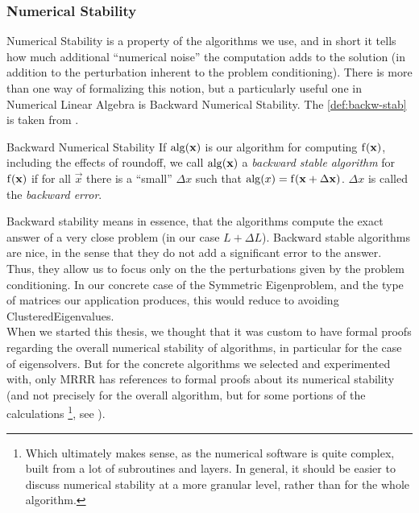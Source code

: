\subsubsection{Numerical Stability}

Numerical Stability is a property of the algorithms we use, and in
short it tells how much additional ``numerical noise'' the computation
adds to the solution (in addition to the perturbation inherent to the
problem conditioning). There is more than one way of formalizing this
notion, but a particularly useful one in Numerical  
Linear Algebra is Backward Numerical Stability. The
\cref{def:backw-stab} is taken from \cite{demmel97}. 

\begin{definition}{Backward Numerical Stability}
  \label{def:backw-stab}
  If $\operatorname{alg}(\mathbf{x})$ is our algorithm for computing $\operatorname{f}(\mathbf{x})$,
  including the effects of roundoff, we call $\operatorname{alg}(\mathbf{x})$ a
  \emph{backward stable algorithm} for $\operatorname{f}(\mathbf{x})$ if for all
  $\vec{x}$ there is a ``small'' $\Delta x$ such that $\operatorname{alg}(x) =
  \operatorname{f}(\mathbf{x} + \Delta \mathbf{x})$. $\Delta x$ is called the
  \emph{backward error}.
\end{definition}

Backward stability means
in essence, that the algorithms compute the exact answer of a very
close problem (in our case $L + \Delta L$). Backward stable algorithms are 
nice, in the sense that they do not add a significant error to the
answer. Thus, they allow us to focus only on the
the perturbations given by the problem conditioning. In our concrete
case of the Symmetric Eigenproblem, and the type of matrices our
application produces, this would reduce to avoiding
\gls{ClusteredEigenvalues}. \\

When we started this thesis, we thought that it was custom to have
formal proofs regarding the overall numerical stability of algorithms,
in particular for the case  of eigensolvers. But for the concrete
algorithms we selected and experimented with, only \gls{MRRR} has 
references to formal proofs about its numerical stability (and not
precisely for the overall algorithm, but for some portions of the
calculations \footnote{Which ultimately makes sense, as the numerical
software is quite complex, built from a lot of subroutines and
layers. In general, it should be easier to discuss numerical stability
at a more granular level, rather than for the whole algorithm.}, see
\cite{dhillon06}). \\   

